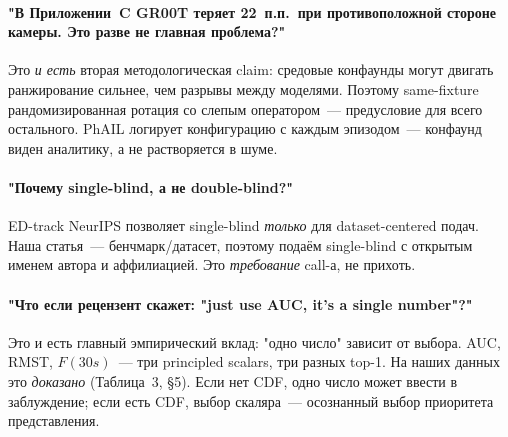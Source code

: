 \documentclass[11pt]{article}
\begin{document}
\paragraph{"В Приложении~C GR00T теряет 22~п.п.\ при противоположной стороне камеры. Это разве не главная проблема?"} Это \emph{и есть} вторая методологическая claim: средовые конфаунды могут двигать ранжирование сильнее, чем разрывы между моделями. Поэтому same-fixture рандомизированная ротация со слепым оператором~--- предусловие для всего остального. PhAIL логирует конфигурацию с каждым эпизодом~--- конфаунд виден аналитику, а не растворяется в шуме.

\paragraph{"Почему single-blind, а не double-blind?"} ED-track NeurIPS позволяет single-blind \emph{только} для dataset-centered подач. Наша статья~--- бенчмарк/датасет, поэтому подаём single-blind с открытым именем автора и аффилиацией. Это \emph{требование} call-а, не прихоть.

\paragraph{"Что если рецензент скажет: "just use AUC, it's a single number"?"} Это и есть главный эмпирический вклад: "одно число" зависит от выбора. AUC, RMST, $F(30s)$~--- три principled scalars, три разных top-1. На наших данных это \emph{доказано} (Таблица~3, \S5). Если нет CDF, одно число может ввести в заблуждение; если есть CDF, выбор скаляра~--- осознанный выбор приоритета представления.
\end{document}
